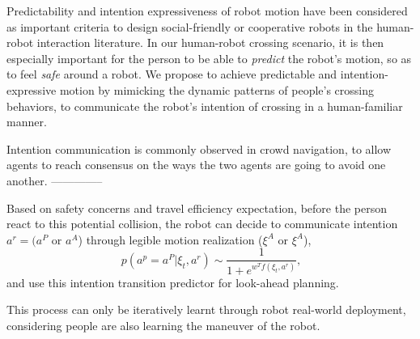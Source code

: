 \documentclass[conference]{IEEEtran}
\begin{document}

Predictability and intention expressiveness of robot motion have been considered 
as important criteria to design social-friendly or cooperative robots in 
the human-robot interaction literature. In our human-robot crossing scenario, 
it is then especially important for the person to be able to \textit{predict} 
the robot's motion, so as to feel \textit{safe} around a robot.
We  propose to achieve predictable and 
intention-expressive motion by mimicking the dynamic patterns of people's
crossing behaviors, to communicate
the robot's intention of crossing in a human-familiar manner.


Intention communication is commonly observed in crowd navigation, to allow agents to reach 
consensus on the ways the two agents are going to avoid one another. 
--------------

Based on safety concerns and travel efficiency expectation, before the person 
react to this potential collision, the robot can 
decide to communicate intention $a^r= (a^P$ or $a^A$) through legible motion 
realization ($\xi^A$ or $\xi^A$),
\begin{equation}~\label{eq:transition}
p(a^p=a^P|\xi_t, a^r) \sim \frac{1}{1+e^{w^Tf(\xi_t,a^r)}},
\end{equation}
and use this intention transition predictor for look-ahead planning.

This process can only be iteratively learnt through robot real-world 
deployment, considering people are also learning the maneuver of the robot.
\end{document}
